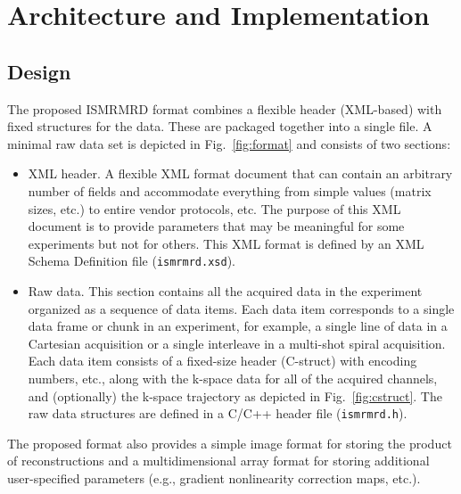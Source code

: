 \documentclass[12pt]{article}
\begin{document}
\section*{Architecture and Implementation}
\subsection*{Design}
The proposed ISMRMRD format combines a flexible header (XML-based) with fixed structures for the data. These are packaged together into a single file.  A minimal raw data set is depicted in Fig.~\ref{fig:format} and consists of two sections:
\begin{itemize}
\item{XML header.} A flexible XML format document that can contain an arbitrary number of fields and accommodate everything from simple values (matrix sizes, etc.) to entire vendor protocols, etc. The purpose of this XML document is to provide parameters that may be meaningful for some experiments but not for others. This XML format is defined by an XML Schema Definition file (\texttt{ismrmrd.xsd}).
\item{Raw data.} This section contains all the acquired data in the experiment organized as a sequence of data items.  Each data item corresponds to a single data frame or chunk in an experiment, for example, a single line of data in a Cartesian acquisition or a single interleave in a multi-shot spiral acquisition. Each data item consists of a fixed-size header (C-struct) with encoding numbers, etc., along with the k-space data for all of the acquired channels, and (optionally) the k-space trajectory as depicted in Fig.~\ref{fig:cstruct}. The raw data structures are defined in a C/C++ header file (\texttt{ismrmrd.h}).
\end{itemize}
The proposed format also provides a simple image format for storing the product of reconstructions and a multidimensional array format for storing additional user-specified parameters (e.g., gradient nonlinearity correction maps, etc.).
\end{document}
